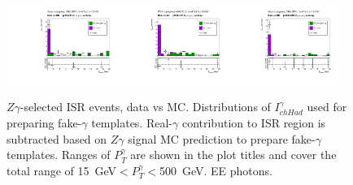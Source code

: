 \begin{figure}[htb]
\begin{center}
\includegraphics[width=0.32\textwidth]{../figs/figs_v11/MUON_ZGamma/PrepareYields/c_TotalDATAvsMC_Endcap__phoPFChIsoCorrFSR_EXCLUDED_pt85to95_.pdf}\includegraphics[width=0.32\textwidth]{../figs/figs_v11/MUON_ZGamma/PrepareYields/c_TotalDATAvsMC_Endcap__phoPFChIsoCorrFSR_EXCLUDED_pt95to120_.pdf}\includegraphics[width=0.32\textwidth]{../figs/figs_v11/MUON_ZGamma/PrepareYields/c_TotalDATAvsMC_Endcap__phoPFChIsoCorrFSR_EXCLUDED_pt120to500_.pdf}\\
  \caption{$Z\gamma$-selected ISR events, data vs MC. Distributions of $I_{chHad}^{\gamma}$ used for preparing fake-$\gamma$ templates. Real-$\gamma$ contribution to ISR region is subtracted based on $Z\gamma$ signal MC prediction to prepare fake-$\gamma$ templates. Ranges of $P_T^{\gamma}$ are shown in the plot titles and cover the total range of 15~GeV$<P_T^{\gamma}<$500~GeV. EE photons.}
  \label{fig:Zg_ISR_phoPFChIsoCorr_Endcap}
  \end{center}
\end{figure}

